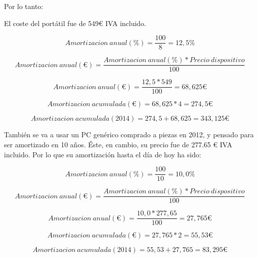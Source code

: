 Por lo tanto:

El coste del port\'atil fue de 549€ IVA incluido.
\begin{center}
\begin{equation}
Amortizacion \ anual (\%) = \frac{100}{8} = 12,5 \%
\end{equation}

\begin{equation}
Amortizacion \ anual (€) = \frac{Amortizacion \ anual(\%) * Precio \ dispositivo}{100}
\end{equation}

\begin{equation}
Amortizacion \ anual (€) = \frac{12,5 * 549}{100} = 68,625 €
\end{equation}

\begin{equation}
Amortizacion \ acumulada (€) = 68,625 * 4 = 274,5 €
\end{equation}

\begin{equation}
Amortizacion \ acumulada (2014) = 274,5 + 68,625 = 343,125 €
\end{equation}

\end{center}

Tambi\'{e}n se va a usar un PC gen\'{e}rico comprado a piezas en 2012, y pensado para
ser amortizado en 10 a\~nos. \'Este, en cambio, su precio fue de 277.65 € IVA incluido.
Por lo que su amortizaci\'on hasta el d\'ia de hoy ha sido:

\begin{center}
\begin{equation}
Amortizacion \ anual (\%) = \frac{100}{10} = 10,0 \%
\end{equation}

\begin{equation}
Amortizacion \ anual (€) = \frac{Amortizacion \ anual(\%) * Precio \ dispositivo}{100}
\end{equation}

\begin{equation}
Amortizacion \ anual (€) = \frac{10,0 * 277,65}{100} = 27,765 €
\end{equation}

\begin{equation}
Amortizacion \ acumulada (€) = 27,765 * 2 = 55,53 €
\end{equation}

\begin{equation}
Amortizacion \ acumulada (2014) = 55,53 + 27,765 = 83,295 €
\end{equation}

\end{center}

